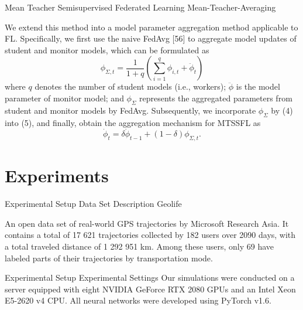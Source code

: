 \documentclass[UTF8]{beamer}
\begin{document}
\begin{frame}
{Mean Teacher Semisupervised Federated Learning}
{Mean-Teacher-Averaging}

We extend this method into a model parameter aggregation method applicable to FL. Specifically, we first use the naive FedAvg [56] to aggregate model updates of student and monitor models, which can be formulated as
\begin{equation}
	\phi_{\Sigma, t}=\frac{1}{1+q}\left(\sum_{i=1}^q \phi_{i, t}+\ddot{\phi}_t\right)
\end{equation}
where $q$ denotes the number of student models (i.e., workers); $\ddot{\phi}$ is the model parameter of monitor model; and $\phi_{\Sigma}$ represents the aggregated parameters from student and monitor models by FedAvg. Subsequently, we incorporate $\phi_{\Sigma}$ by (4) into (5), and finally, obtain the aggregation mechanism for MTSSFL as
\begin{equation}
\dot{\phi}_t=\delta \dot{\phi}_{t-1}+(1-\delta) \phi_{\Sigma, t} .
\end{equation}
\end{frame}



\section{Experiments}

\begin{frame}
{Experimental Setup}
{Data Set Description}
{Geolife}

An open data set of real-world GPS trajectories by Microsoft Research Asia. It contains a total of 17 621 trajectories collected by 182 users over 2090 days, with a total traveled distance of 1 292 951 km. Among these users, only 69 have labeled parts of their trajectories by transportation mode.

\end{frame}

\begin{frame}
{Experimental Setup}
{Experimental Settings}
Our simulations were conducted on a server equipped with eight NVIDIA GeForce RTX 2080 GPUs and an Intel Xeon E5-2620 v4 CPU. All neural networks were developed using PyTorch v1.6.
\end{frame}
\end{document}
